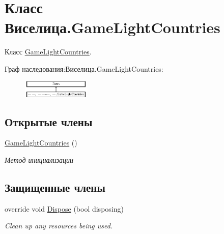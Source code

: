 \hypertarget{class_xD0_x92_xD0_xB8_xD1_x81_xD0_xB5_xD0_xBB_xD0_xB8_xD1_x86_xD0_xB0_1_1_game_light_countries}{\section{Класс Виселица.\+Game\+Light\+Countries}
\label{class_xD0_x92_xD0_xB8_xD1_x81_xD0_xB5_xD0_xBB_xD0_xB8_xD1_x86_xD0_xB0_1_1_game_light_countries}
}


Класс \hyperlink{class_xD0_x92_xD0_xB8_xD1_x81_xD0_xB5_xD0_xBB_xD0_xB8_xD1_x86_xD0_xB0_1_1_game_light_countries}{Game\+Light\+Countries}.  


Граф наследования\+:Виселица.\+Game\+Light\+Countries\+:\begin{figure}[H]
\begin{center}
\leavevmode
\includegraphics[height=0.824742cm]{class_xD0_x92_xD0_xB8_xD1_x81_xD0_xB5_xD0_xBB_xD0_xB8_xD1_x86_xD0_xB0_1_1_game_light_countries}
\end{center}
\end{figure}
\subsection*{Открытые члены}
\begin{DoxyCompactItemize}
\item 
\hyperlink{class_xD0_x92_xD0_xB8_xD1_x81_xD0_xB5_xD0_xBB_xD0_xB8_xD1_x86_xD0_xB0_1_1_game_light_countries_a1abbe9aa9be0d413ffed9f622798f1dc}{Game\+Light\+Countries} ()
\begin{DoxyCompactList}\small\item\em Метод инициализации \end{DoxyCompactList}\end{DoxyCompactItemize}
\subsection*{Защищенные члены}
\begin{DoxyCompactItemize}
\item 
override void \hyperlink{class_xD0_x92_xD0_xB8_xD1_x81_xD0_xB5_xD0_xBB_xD0_xB8_xD1_x86_xD0_xB0_1_1_game_light_countries_a10fdb43e2a2f0304822a77d5d799c14f}{Dispose} (bool disposing)
\begin{DoxyCompactList}\small\item\em Clean up any resources being used. \end{DoxyCompactList}\end{DoxyCompactItemize}


